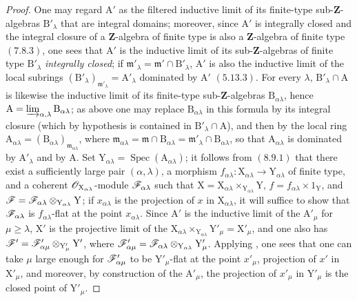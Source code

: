 \begin{proof}
\medskip
One may regard $\mathrm{A}'$ as the filtered inductive limit of its finite-type sub-$\mathbf{Z}$-algebras
$\mathrm{B}'_\lambda$ that are integral domains; moreover, since $\mathrm{A}'$ is integrally closed and the integral
closure of a $\mathbf{Z}$-algebra of finite type is also a $\mathbf{Z}$-algebra of finite type $(7.8.3)$, one
sees that $\mathrm{A}'$ is the inductive limit of its sub-$\mathbf{Z}$-algebras of finite type $\mathrm{B}'_\lambda$ \emph{integrally closed};
if $\mathfrak{m}'_\lambda=\mathfrak{m}'\cap\mathrm{B}'_\lambda$, $\mathrm{A}'$ is also the inductive limit of the local subrings $(\mathrm{B}'_\lambda)_{\mathfrak{m}'_\lambda}=\mathrm{A}'_\lambda$
dominated by $\mathrm{A}'$ $(5.13.3)$. For every $\lambda$, $\mathrm{B}'_\lambda\cap\mathrm{A}$ is likewise the inductive limit of its finite-type
sub-$\mathbf{Z}$-algebras $\mathrm{B}_{\alpha\lambda}$, hence $\mathrm{A}=\varinjlim_{\alpha,\lambda}\mathrm{B}_{\alpha\lambda}$; as above one may replace $\mathrm{B}_{\alpha\lambda}$
in this formula by its integral closure (which by hypothesis is contained in $\mathrm{B}'_\lambda\cap\mathrm{A}$), and then by the local ring
$\mathrm{A}_{\alpha\lambda}=(\mathrm{B}_{\alpha\lambda})_{\mathfrak{m}_{\alpha\lambda}}$, where
$\mathfrak{m}_{\alpha\lambda}=\mathfrak{m}\cap\mathrm{B}_{\alpha\lambda}=\mathfrak{m}'_\lambda\cap\mathrm{B}_{\alpha\lambda}$, so that $\mathrm{A}_{\alpha\lambda}$ is dominated by $\mathrm{A}'_\lambda$ and by $\mathrm{A}$.
Set $\mathrm{Y}_{\alpha\lambda}=\operatorname{Spec}(\mathrm{A}_{\alpha\lambda})$; it follows from $(8.9.1)$ that there exist a sufficiently large pair
$(\alpha,\lambda)$, a morphism $f_{\alpha\lambda}:\mathrm{X}_{\alpha\lambda}\to\mathrm{Y}_{\alpha\lambda}$ of finite type, and a
coherent $\mathscr{O}_{\mathrm{X}_{\alpha\lambda}}$-module $\mathscr{F}_{\alpha\lambda}$ such that
$\mathrm{X}=\mathrm{X}_{\alpha\lambda}\times_{\mathrm{Y}_{\alpha\lambda}}\mathrm{Y}$,
$f=f_{\alpha\lambda}\times 1_\mathrm{Y}$, and $\mathscr{F}=\mathscr{F}_{\alpha\lambda}\otimes_{\mathrm{Y}_{\alpha\lambda}}\mathrm{Y}$; if $x_{\alpha\lambda}$
is the projection of $x$ in $\mathrm{X}_{\alpha\lambda}$, it will suffice to show that $\mathscr{F}_{\alpha\lambda}$ is $f_{\alpha\lambda}$-flat at the point $x_{\alpha\lambda}$.
Since $\mathrm{A}'$ is the inductive limit of the $\mathrm{A}'_\mu$ for $\mu\geq\lambda$, $\mathrm{X}'$ is the projective limit of the
$\mathrm{X}_{\alpha\lambda}\times_{\mathrm{Y}_{\alpha\lambda}}\mathrm{Y}'_\mu=\mathrm{X}'_\mu$, and one also has
$\mathscr{F}'=\mathscr{F}'_{\alpha\mu}\otimes_{\mathrm{Y}'_\mu}\mathrm{Y}'$, where
$\mathscr{F}'_{\alpha\mu}=\mathscr{F}_{\alpha\lambda}\otimes_{\mathrm{Y}_{\alpha\lambda}}\mathrm{Y}'_\mu$. Applying
, one sees that one can take $\mu$ large enough for $\mathscr{F}'_{\alpha\mu}$ to be $\mathrm{Y}'_\mu$-flat at the
point $x'_\mu$, projection of $x'$ in $\mathrm{X}'_\mu$, and moreover, by construction of the $\mathrm{A}'_\mu$, the projection
of $x'_\mu$ in $\mathrm{Y}'_\mu$ is the closed point of $\mathrm{Y}'_\mu$.


\end{proof}
